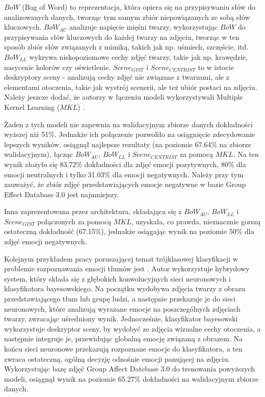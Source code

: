 $BoW$ (Bag of Word) \cite{BoW} to reprezentacja, która opiera się na przypisywaniu słów do analizowanych danych, tworząc tym samym zbiór niepowiązanych ze sobą słów kluczowych.
$BoW_{AU}$ analizuje napięcie mięśni twarzy, wykorzystując $BoW$ do przypisywania słów kluczowych do każdej twarzy na zdjęciu, tworząc w ten sposób zbiór słów związanych z mimiką, takich jak np. uśmiech, szczęście, itd.
$BoW_{LL}$ wykrywa niskopoziomowe cechy zdjęć twarzy, takie jak np. krawędzie, nasycenie kolorów czy oświetlenie. 
$Scene_{GIST}$ i $Scene_{CENTRIST}$ to w istocie deskryptory sceny - analizują cechy zdjęć nie związane z twarzami, ale z elementami otoczenia, takie jak wystrój scenerii, ale też ubiór postaci na zdjęciu.
Należy jeszcze dodać, że autorzy w łączeniu modeli wykorzystywali Multiple Kernel Learning ($MKL$) \cite{MKL}. 

Żaden z tych modeli nie zapewnia na walidacyjnym zbiorze danych dokładności wyższej niż 51\%. Jednakże ich połączenie pozwoliło na osiągnięcie zdecydowanie lepszych wyników. \cite{GAD} osiągnął najlepsze rezultaty (na poziomie 67.64\% na zbiorze walidacyjnym), łącząc $BoW_{AU}$, $BoW_{LL}$ i $Scene_{CENTRIST}$ za pomocą $MKL$. Na ten wynik złożyło się 83.72\% dokładności dla zdjęć emocji pozytywnych, 80\% dla emocji neutralnych i tylko 31.03\% dla emocji negatywnych. Należy przy tym zauważyć, że zbiór zdjęć przedstawiających emocje negatywne w bazie Group Effect Database 3.0 jest najmniejszy.

Inna zaprezentowana przez \cite{GAD} architektura, składająca się z $BoW_{AU}$, $BoW_{LL}$ i $Scene_{GIST}$ połączonych za pomocą $MKL$, uzyskała, co prawda, nieznacznie gorszą ostateczną dokładność (67.15\%), jednakże osiągając wynik na poziomie 50\% dla zdjęć emocji negatywnych.

Kolejnym przykładem pracy poruszającej temat trójklasowej klasyfikacji w problemie rozpoznawania emocji tłumów jest \cite{SGarg}. Autor wykorzystuje hybrydowy system, który składa się z głębokich konwolucyjnych sieci neuronowych i klasyfikatora bayesowskiego. Na początku wydobywa zdjęcia twarzy z obrazu przedstawiającego tłum lub grupę ludzi, a następnie przekazuje je do sieci neuronowych, które analizują wyrażane emocje na poszczególnych zdjęciach twarzy, zwracając uśredniony wynik. Jednocześnie, klasyfikator bayesowski wykorzystuje deskryptor sceny, by wydobyć ze zdjęcia wizualne cechy otoczenia, a następnie integruje je, przewidując globalną emocję związaną z obrazem. Na końcu sieci neuronowe przekazują rozpoznane emocje do klasyfikatora, a ten zwraca ostateczną, ogólną decyzję odnośnie emocji panującej na zdjęciu. Wykorzystując bazę zdjęć Group Affect Datebase 3.0 do trenowania powyższych modeli, \cite{SGarg} osiągnął wynik na poziomie 65.27\% dokładności na walidacyjnym zbiorze danych.


